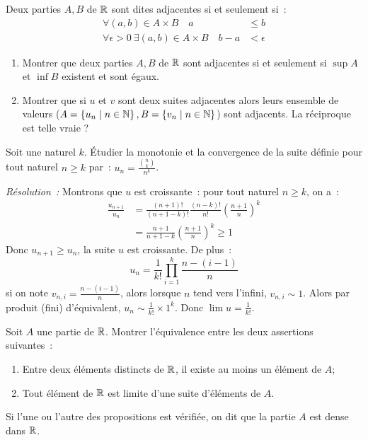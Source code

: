 \begin{exercice}
    Deux parties \(A, B\) de \(\mathbb{R}\) sont dites adjacentes si et seulement si~:
    \begin{align}
        \forall (a,b) \in A \times B \quad a & \leqslant b \\       
        \forall \epsilon >0 \ \exists (a,b) \in A \times B \quad b-a & < \epsilon
    \end{align}
    \begin{enumerate}
        \item Montrer que deux parties \(A, B\) de \(\mathbb{R}\) sont adjacentes si et seulement si \(\sup A\) et \(\inf B\) existent et sont égaux.
        \item Montrer que si \(u\) et \(v\) sont deux suites adjacentes alors leurs ensemble de valeurs (\(A=\left\{u_n\mathrel{}\middle|\mathrel{}n\in\mathbb{N}\right\}, B=\left\{v_n\mathrel{}\middle|\mathrel{}n\in\mathbb{N}\right\}\)) sont adjacents. La réciproque est telle vraie ?
    \end{enumerate}
\end{exercice}
\begin{exercice}
    Soit une naturel \(k\). Étudier la monotonie et la convergence de la suite définie pour tout naturel \(n \geqslant k\) par~: \(u_n =\frac{\binom{n}{k}}{n^k}\).
\end{exercice}
\emph{Résolution~:}
Montrons que \(u\) est croissante~: pour tout naturel \(n\geqslant k\), on a~:
\begin{align*}
    \frac{u_{n+1}}{u_n} &= \frac{(n+1)!}{(n+1-k)!}\frac{(n-k)!}{n!} \left(\frac{n+1}{n}\right)^k \\
                        &= \frac{n+1}{n+1-k}\left(\frac{n+1}{n}\right)^k \geqslant 1
\end{align*}
Donc \(u_{n+1} \geqslant u_n\), la suite \(u\) est croissante. De plus~:
\[u_n = \frac{1}{k!} \prod_{i=1}^k \frac{n-(i-1)}{n}\]
si on note \(v_{n,i} = \frac{n-(i-1)}{n}\), alors lorsque \(n\) tend vers l'infini, \(v_{n,i} \sim 1\). Alors par produit (fini) d'équivalent, \(u_n \sim \frac{1}{k!} \times 1^k\). Donc \(\lim u = \frac{1}{k!}\).
\begin{exercice}[Densité]
    Soit \(A\) une partie de \(\mathbb{R}\). Montrer l'équivalence entre les deux assertions suivantes~:
    \begin{enumerate}
        \item Entre deux éléments distincts de \(\mathbb{R}\), il existe au moins un élément de \(A\);
        \item Tout élément de \(\mathbb{R}\) est limite d'une suite d'éléments de \(A\).
    \end{enumerate}
    Si l'une ou l'autre des propositions est vérifiée, on dit que la partie \(A\) est dense dans \(\mathbb{R}\).
\end{exercice}
